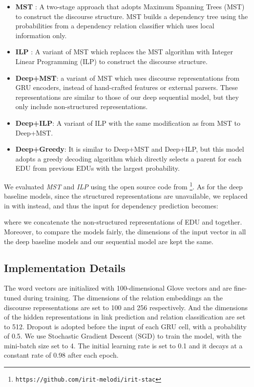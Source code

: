 \documentclass[letterpaper]{article} \usepackage{aaai19}  \usepackage{times}  \usepackage{helvet}  \usepackage{courier}  \usepackage{url}  \usepackage{graphicx}  \usepackage{amssymb}
\begin{document}
\begin{itemize}
    \item \textbf{MST} \cite{afantenos2015discourse}: A two-stage approach that adopts Maximum Spanning Trees (MST) to construct the discourse structure. MST builds a dependency tree using the probabilities from a dependency relation classifier which uses local information only.
    \item \textbf{ILP} \cite{perret2016integer} : A variant of MST which replaces the MST algorithm with Integer Linear Programming (ILP) to construct the discourse structure.
    \item \textbf{Deep+MST}: a variant of MST  which uses discourse representations from GRU encoders, instead of hand-crafted features or external parsers. 
    These representations are similar to those of our deep sequential model, but they only include non-structured representations.
    \item \textbf{Deep+ILP}: A variant of  ILP with the same modification as from MST to Deep+MST.
    \item \textbf{Deep+Greedy}: It is similar to Deep+MST and Deep+ILP, but this model adopts a greedy decoding algorithm which directly selects a parent for each EDU from previous EDUs with the largest probability.
\end{itemize}

We evaluated \emph{MST} and \emph{ILP} using the open source code from \cite{afantenos2015discourse,perret2016integer}\footnote{\texttt{https://github.com/irit-melodi/irit-stac}}. As for the deep baseline models, since the structured representations are unavailable, we replaced  in  with  instead, and thus the input for dependency prediction becomes:

where we concatenate the non-structured representations of EDU  and  together.
Moreover, to compare the models fairly, the dimensions of the input vector in all the deep baseline models and our sequential model are kept the same.

\subsection{Implementation Details}

The word vectors are initialized with 100-dimensional Glove vectors \cite{pennington2014glove} and are fine-tuned during training. 
The dimensions of the relation embeddings an the  discourse representations are set to 100 and 256 respectively.
And the dimensions of the hidden representations in link prediction and relation classification are set to 512.
Dropout is adopted before the input of each GRU cell, with a probability of 0.5.
We use Stochastic Gradient Descent (SGD) to train the model, with the mini-batch size set to 4. The initial learning rate is set to 0.1 and it decays at a constant rate of 0.98 after each epoch.
\end{document}
